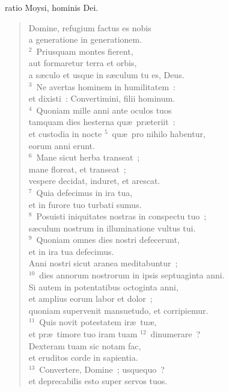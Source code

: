 \bchapter[Psalm]
ratio Moysi, hominis Dei. \begin{verse}Domine, refugium factus es nobis\\ a generatione in generationem.\\
${}^{2}$~Priusquam montes fierent,\\ aut formaretur terra et orbis,\\ a s\ae culo et usque in s\ae culum tu es, Deus.\\
${}^{3}$~Ne avertas hominem in humilitatem~:\\ et dixisti~: Convertimini, filii hominum.\\
${}^{4}$~Quoniam mille anni ante oculos tuos\\ tamquam dies hesterna qu\ae\ pr\ae teriit~:\\ et custodia in nocte
${}^{5}$~qu\ae\ pro nihilo habentur,\\ eorum anni erunt.\\
${}^{6}$~Mane sicut herba transeat~;\\ mane floreat, et transeat~;\\ vespere decidat, induret, et arescat.\\
${}^{7}$~Quia defecimus in ira tua,\\ et in furore tuo turbati sumus.\\
${}^{8}$~Posuisti iniquitates nostras in conspectu tuo~;\\ s\ae culum nostrum in illuminatione vultus tui.\\
${}^{9}$~Quoniam omnes dies nostri defecerunt,\\ et in ira tua defecimus.\\ Anni nostri sicut aranea meditabuntur~;\\
${}^{10}$~dies annorum nostrorum in ipsis septuaginta anni.\\ Si autem in potentatibus octoginta anni,\\ et amplius eorum labor et dolor~;\\ quoniam supervenit mansuetudo, et corripiemur.\\
${}^{11}$~Quis novit potestatem ir\ae\ tu\ae ,\\ et pr\ae\ timore tuo iram tuam
${}^{12}$~dinumerare~?\\ Dexteram tuam sic notam fac,\\ et eruditos corde in sapientia.\\
${}^{13}$~Convertere, Domine~; usquequo~?\\ et deprecabilis esto super servos tuos.\\

\end{verse}
